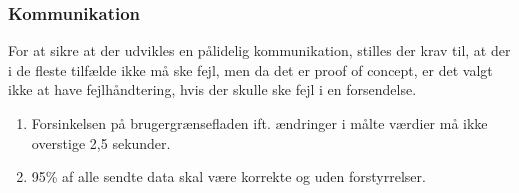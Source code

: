 \subsubsection{Kommunikation}
For at sikre at der udvikles en pålidelig kommunikation, stilles der krav til, at der i de fleste tilfælde ikke må ske fejl, men da det er proof of concept, er det valgt ikke at have fejlhåndtering, hvis der skulle ske fejl i en forsendelse.

\begin{enumerate}
	\item Forsinkelsen på brugergrænsefladen ift. ændringer i målte værdier må ikke overstige 2,5 sekunder. 
	\item 95\% af alle sendte data skal være korrekte og uden forstyrrelser. 
\end{enumerate} 

